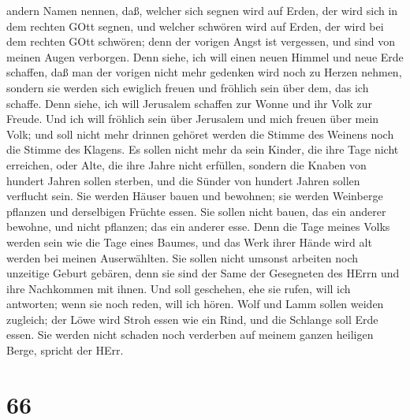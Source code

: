 andern Namen nennen,  daß, welcher sich segnen wird auf
Erden, der wird sich in dem rechten GOtt segnen, und welcher schwören
wird auf Erden, der wird bei dem rechten GOtt schwören; denn der vorigen
Angst ist vergessen, und sind von meinen Augen verborgen. 
Denn siehe, ich will einen neuen Himmel und neue Erde schaffen, daß man
der vorigen nicht mehr gedenken wird noch zu Herzen nehmen,
 sondern sie werden sich ewiglich freuen und fröhlich sein
über dem, das ich schaffe. Denn siehe, ich will Jerusalem schaffen zur
Wonne und ihr Volk zur Freude.  Und ich will fröhlich sein
über Jerusalem und mich freuen über mein Volk; und soll nicht mehr
drinnen gehöret werden die Stimme des Weinens noch die Stimme des
Klagens.  Es sollen nicht mehr da sein Kinder, die ihre
Tage nicht erreichen, oder Alte, die ihre Jahre nicht erfüllen, sondern
die Knaben von hundert Jahren sollen sterben, und die Sünder von hundert
Jahren sollen verflucht sein.  Sie werden Häuser bauen und
bewohnen; sie werden Weinberge pflanzen und derselbigen Früchte essen.
 Sie sollen nicht bauen, das ein anderer bewohne, und nicht
pflanzen; das ein anderer esse. Denn die Tage meines Volks werden sein
wie die Tage eines Baumes, und das Werk ihrer Hände wird alt werden bei
meinen Auserwählten.  Sie sollen nicht umsonst arbeiten
noch unzeitige Geburt gebären, denn sie sind der Same der Gesegneten des
HErrn und ihre Nachkommen mit ihnen.  Und soll geschehen,
ehe sie rufen, will ich antworten; wenn sie noch reden, will ich hören.
 Wolf und Lamm sollen weiden zugleich; der Löwe wird Stroh
essen wie ein Rind, und die Schlange soll Erde essen. Sie werden nicht
schaden noch verderben auf meinem ganzen heiligen Berge, spricht der
HErr.

\hypertarget{section-65}{%
\section{66}\label{section-65}}

